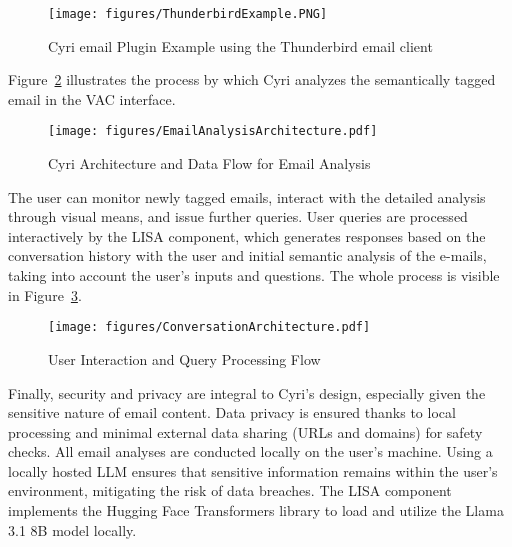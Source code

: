 \begin{figure}[htbp]
  \centering
  \texttt{[image: figures/ThunderbirdExample.PNG]}
  \caption{Cyri email Plugin Example using the Thunderbird email client}
  \label{fig:thunderbirdexample}
\end{figure}

Figure~\ref{fig:EmailAnalysisArchitecture} illustrates the process by which Cyri analyzes the semantically tagged email in the VAC interface.

\begin{figure}[htbp]
  \centering
  \texttt{[image: figures/EmailAnalysisArchitecture.pdf]}
  \caption{Cyri Architecture and Data Flow for Email Analysis}
  \label{fig:EmailAnalysisArchitecture}
\end{figure}

The user can monitor newly tagged emails, interact with the detailed analysis through visual means, and issue further queries. User queries are processed interactively by the LISA component, which generates responses based on the conversation history with the user and initial semantic analysis of the e-mails, taking into account the user's inputs and questions. The whole process is visible in Figure~\ref{fig:ConversationArchitecture}.


\begin{figure}[htbp]
  \centering
  \texttt{[image: figures/ConversationArchitecture.pdf]}
  \caption{User Interaction and Query Processing Flow}
  \label{fig:ConversationArchitecture}
\end{figure}



Finally, security and privacy are integral to Cyri’s design, especially given the sensitive
nature of email content. Data privacy is ensured thanks to local processing and
minimal external data sharing (URLs and domains) for safety checks.
All email analyses are conducted locally on the user’s machine. Using a locally
hosted LLM ensures that sensitive information remains within the
user’s environment, mitigating the risk of data breaches. The LISA component implements the Hugging Face Transformers library to load and utilize the Llama 3.1 8B model locally.
